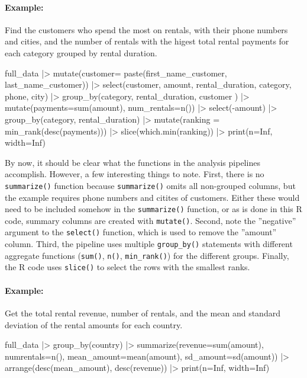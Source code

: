\paragraph*{Example:} Find the customers who spend the most on rentals, with their phone numbers and cities, and the number of rentals with the higest total rental payments for each category grouped by rental duration.

\begin{samepage}
\begin{Rcode}
full_data |>
   mutate(customer= paste(first_name_customer, last_name_customer)) |>
   select(customer, amount, rental_duration, category, phone, city) |>
   group_by(category, rental_duration, customer ) |>
   mutate(payments=sum(amount), num_rentals=n()) |>
   select(-amount) |>
   group_by(category, rental_duration) |>
   mutate(ranking = min_rank(desc(payments))) |>
   slice(which.min(ranking)) |>
   print(n=Inf, width=Inf)
\end{Rcode}
\end{samepage}

By now, it should be clear what the functions in the analysis pipelines accomplish. However, a few interesting things to note. First, there is no \texttt{summarize()} function because \texttt{summarize()} omits all non-grouped columns, but the example requires phone numbers and citites of customers. Either these would need to be included somehow in the \texttt{summarize()} function, or as is done in this R code, summary columns are created with \texttt{mutate()}. Second, note the ''negative'' argument to the \texttt{select()} function, which is used to remove the ''amount'' column. Third, the pipeline uses multiple \texttt{group\_by()} statements with different aggregate functions (\texttt{sum()}, \texttt{n()}, \texttt{min\_rank()}) for the different groups. Finally, the R code uses \texttt{slice()} to select the rows with the smallest ranks.

\paragraph*{Example:} Get the total rental revenue, number of rentals, and the mean and standard deviation of the rental amounts for each country.

\begin{samepage}
\begin{Rcode}
full_data |>
  group_by(country) |>
  summarize(revenue=sum(amount), 
            numrentals=n(),
            mean_amount=mean(amount),
            sd_amount=sd(amount)) |>
  arrange(desc(mean_amount),
          desc(revenue)) |>
  print(n=Inf, width=Inf)  
\end{Rcode}
\end{samepage}

